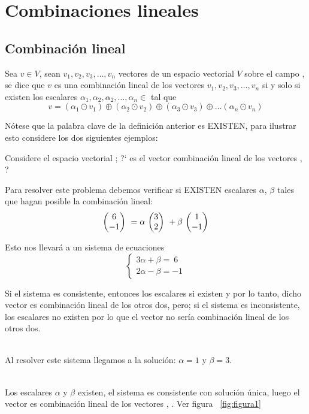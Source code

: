 \chapter{Combinaciones lineales}

\section{Combinación lineal}
\begin{dfn}
Sea $v\in V$, sean $v_1, v_2, v_3, \ldots, v_n$ vectores de un espacio vectorial $V$ sobre el campo \doblek , se dice que $v$ es una combinaci\'on lineal de los vectores $v_1, v_2, v_3, \ldots, v_n$ si y solo si existen los escalares $\alpha_1, \alpha_2, \alpha_2, \ldots, \alpha_n \in$ \doblek tal que
\[
v=\left(\alpha_1\odot v_1\right)\oplus
\left(\alpha_2\odot v_2\right)\oplus
\left(\alpha_3\odot v_3\right)\oplus
\ldots
\left(\alpha_n\odot v_n\right)
\]
\end{dfn}
Nótese que la palabra clave de la definici\'on anterior es EXISTEN, para ilustrar esto considere los
dos siguientes ejemplos:
\begin{ejemplo}
Considere el espacio vectorial \rdos; ?` es el vector  combinaci\'on lineal de los vectores , ?
\end{ejemplo}

Para resolver este problema debemos verificar si EXISTEN escalares $\alpha$, $\beta$ tales que hagan posible la combinaci\'on lineal:
\[\mbox{ \ensuremath{\begin{pmatrix} 6\\ -1\\ \end{pmatrix} } } =\alpha\mbox{ \ensuremath{\begin{pmatrix} 3\\ 2\\ \end{pmatrix} } }+\beta\mbox{ \ensuremath{\begin{pmatrix} 1\\ -1\\ \end{pmatrix} } }\]

Esto nos llevar\'a a un sistema de ecuaciones
\[
\left\{
\begin{array}{l}
3\alpha+\beta=\ 6\\
2\alpha-\beta=-1
\end{array}
\right.
\]

Si el sistema es consistente, entonces los escalares si existen y por lo tanto, dicho vector es combinación lineal de los otros dos, pero; si el sistema es inconsistente, los escalares no existen
por lo que el vector no sería combinación lineal de los otros dos.

~\\
Al resolver este sistema llegamos a la soluci\'on:
$\alpha=1$ y $\beta=3$.

~\\
Los escalares $\alpha$ y $\beta$ existen, el sistema es consistente con soluci\'on \'unica, luego el vector  es combinaci\'on lineal de los vectores , . Ver figura ~\ref{fig:figura1}

